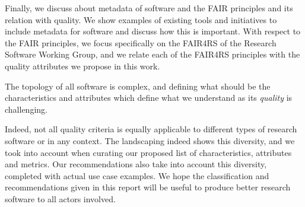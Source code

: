 Finally, we discuss about metadata of software and the FAIR principles and its relation with quality. We show examples of existing tools and initiatives to include metadata for software and discuss how this is important. With respect to the FAIR principles, we focus specifically on the FAIR4RS of the Research Software Working Group, and we relate each of the FAIR4RS principles with the quality attributes we propose in this work.

The topology of all software is complex, and defining what should be the characteristics and attributes which define what we understand as its \textit{quality} is challenging.

Indeed, not all quality criteria is equally applicable to different types of research software or in any context. The landscaping indeed shows this diversity, and we took into account when curating our proposed list of characteristics, attributes and metrics. Our recommendations also take into account this diversity, completed with actual use case examples.
%
We hope the classification and recommendations given in this report will be useful to produce better research software to all actors involved.